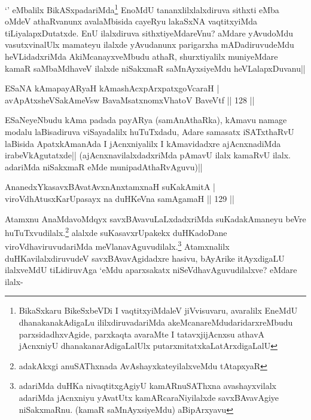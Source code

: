 \begin{artha}
`\stext ' eMbalilx BikASxpadariMda\footnote[1]{BikaSxkaru BikeSxbeVDi I vaqtitxyiMdaleV jiVvisuvaru, avaralilx EneMdU dhanakanakAdigaLu ililxdiruvadariMda  akeMcanareMdudaridarxreMbudu parxsidadhxvAgide, parxkaqta avaraMte I tatavxjijAcnxsu athavA jAcnxniyU dhanakanarAdigaLalUlx putarxmitatxkaLatArxdigaLalU} EnoMdU tananxlilxlalxdiruva sithxti eMba oMdeV athaRvanunx avalaMbisida cayeRyu lakaSxNA vaqtitxyiMda tiLiyalapxDutatxde. EnU ilalxdiruva sithxtiyeMdareVnu? aMdare yAvudoMdu vasutxvinalUlx mamateyu ilalxde yAvudanunx parigarxha mADadiruvudeMdu heVLidadxriMda AkiMcanayxveMbudu athaR, shurxtiyalilx muniyeMdare kamaR saMbaMdhaveV ilalxde niSakxmaR saMnAyxsiyeMdu heVLalapxDuvanu||
\end{artha}%


\begin{shl}
ESaNA kAmapayARyaH kAmashAcxpArxpatxgoVcaraH |\\
avApAtxsheVSakAmeV\s sw BavaMsatxnomxVhatoV BaveVtf \hfill || 128 ||
\end{shl}

\begin{artha}
ESaNeyeNbudu kAma padada payARya (samAnAthaRka), kAmavu namage modalu laBisadiruva viSayadalilx huTuTxdadu, Adare samasatx iSATxthaRvU laBisida ApatxkAmanAda I jAcnxniyalilx I kAmavidadxre ajAcnxnadiMda irabeVkAgutatxde|| (ajAcnxnavilalxdadxriMda pAmavU ilalx kamaRvU ilalx. adariMda  niSakxmaR eMde munipadAthaRvAguvu)||
\end{artha}


\begin{shl}
AnanedxYkasavxBAvatAvxnAnx\s \s tamxnaH suKakAmitA |\\
viroVdhAtusxKarUpasayx na duHKeVna samAgamaH \hfill || 129 ||
\end{shl}

\begin{artha}
Atamxnu AnaMdavoMdqyx savxBAvavuLaLxdadxriMda suKadakAmaneyu beVre huTuTxvudilalx.\footnote[1]{adakAkxgi anuSAThxnada AvAshayxkateyilalxveMdu tAtapxyaR} alalxde suKasavxrUpakekx duHKadoDane viroVdhaviruvudariMda meVlanavAguvudilalx.\footnote[2]{adariMda duHKa nivaqtitxgAgiyU kamARnuSAThxna avashayxvilalx adariMda jAcnxniyu yAvatUtx kamARcaraNiyilalxde savxBAvavAgiye niSakxmaRnu. (kamaR saMnAyxsiyeMdu) aBipArxyavu} Atamxnalilx duHKavilalxdiruvudeV savxBAvavAgidadxre hasivu, bAyArike itAyxdigaLU ilalxveMdU tiLidiruvAga `\stext eMdu aparxsakatx niSeVdhavAguvudilalxve? eMdare ilalx-
\end{artha}%

